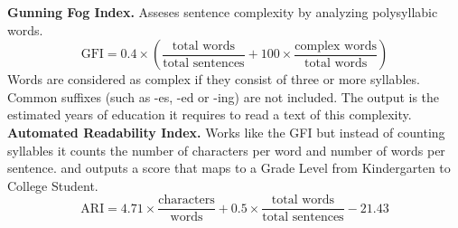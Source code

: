 \documentclass[11pt]{article}
\begin{document}
\textbf{Gunning Fog Index.} Asseses sentence complexity by analyzing polysyllabic words.
{\small
\[
    \text{GFI} = 0.4 \times \left(\frac{\text{total words}}{\text{total sentences}} + 100 \times \frac{\text{complex words}}{\text{total words}}\right)
\]}
Words are considered as complex if they consist of three or more syllables. Common suffixes (such as -es, -ed or -ing) are not included. The output is the 
estimated years of education it requires to read a text of this complexity.\\ 

\textbf{Automated Readability Index.} Works like the GFI but instead of counting syllables it counts the number of characters per word and number of words per sentence. 
and outputs a score that maps to a Grade Level from Kindergarten to College Student. 
{\small
\[
    \text{ARI} = 4.71 \times \frac{\text{characters}}{\text{words}} + 0.5 \times \frac{\text{total words}}{\text{total sentences}} - 21.43
\]}
\end{document}
